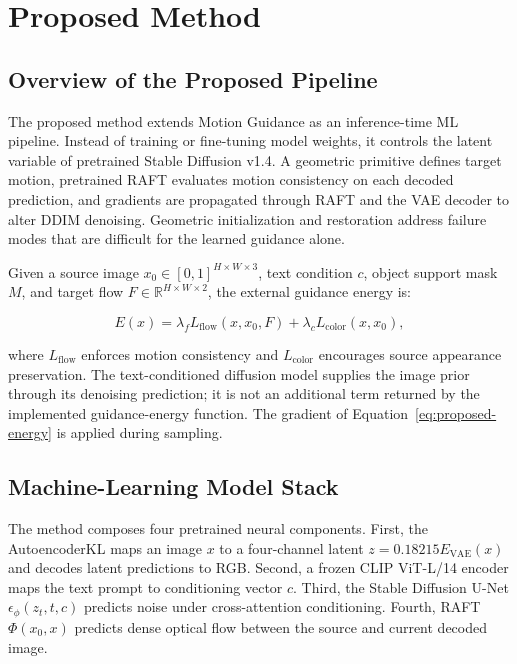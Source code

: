 \setlength{\footskip}{8mm}

\chapter{Proposed Method}
\label{ch:methodology}

\section{Overview of the Proposed Pipeline}

The proposed method extends Motion Guidance as an inference-time ML pipeline. Instead of training or fine-tuning model weights, it controls the latent variable of pretrained Stable Diffusion v1.4. A geometric primitive defines target motion, pretrained RAFT evaluates motion consistency on each decoded prediction, and gradients are propagated through RAFT and the VAE decoder to alter DDIM denoising. Geometric initialization and restoration address failure modes that are difficult for the learned guidance alone.

Given a source image $x_0 \in [0,1]^{H \times W \times 3}$, text condition $c$, object support mask $M$, and target flow $F \in \mathbb{R}^{H \times W \times 2}$, the external guidance energy is:

\begin{equation}
E(x) = \lambda_f L_{\mathrm{flow}}(x, x_0, F) + \lambda_c L_{\mathrm{color}}(x, x_0),
\label{eq:proposed-energy}
\end{equation}

where $L_{\mathrm{flow}}$ enforces motion consistency and $L_{\mathrm{color}}$ encourages source appearance preservation. The text-conditioned diffusion model supplies the image prior through its denoising prediction; it is not an additional term returned by the implemented guidance-energy function. The gradient of Equation~\ref{eq:proposed-energy} is applied during sampling.

\section{Machine-Learning Model Stack}

The method composes four pretrained neural components. First, the AutoencoderKL maps an image $x$ to a four-channel latent $z=0.18215E_{\mathrm{VAE}}(x)$ and decodes latent predictions to RGB. Second, a frozen CLIP ViT-L/14 encoder maps the text prompt to conditioning vector $c$. Third, the Stable Diffusion U-Net $\epsilon_\phi(z_t,t,c)$ predicts noise under cross-attention conditioning. Fourth, RAFT $\Phi(x_0,x)$ predicts dense optical flow between the source and current decoded image.

